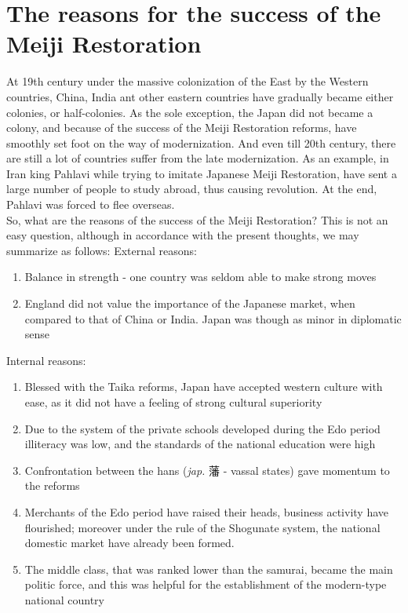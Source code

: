 \documentclass[11pt]{book}
\begin{document}
\section{The reasons for the success of the Meiji Restoration}
At 19th century under the massive colonization of the East by the Western countries, China, India ant other eastern countries have gradually became
either colonies, or half-colonies. As the sole exception, the Japan did not became a colony, and because of the success of the Meiji Restoration
reforms, have smoothly set foot on the way of modernization. And even till 20th century, there are still a lot of countries suffer from the late
modernization. As an example, in Iran king Pahlavi while trying to imitate Japanese Meiji Restoration, have sent a large number of people
to study abroad, thus causing revolution. At the end, Pahlavi was forced to flee overseas.\\
So, what are the reasons of the success of the Meiji Restoration? This is not an easy question, although in accordance with the present thoughts,
we may summarize as follows:
External reasons:
\begin{enumerate}
	\item{Balance in strength - one country was seldom able to make strong moves}
	\item{England did not value the importance of the Japanese market, when compared to that of China or India. Japan was though as minor
		in diplomatic sense}
\end{enumerate}
Internal reasons:
\begin{enumerate}
	\item{Blessed with the Taika reforms, Japan have accepted western culture with ease, as it did not have a feeling of strong cultural
		superiority}
	\item{Due to the system of the private schools developed during the Edo period illiteracy was low, and the standards of the national
		education were high}
	\item{Confrontation between the hans (\textit{jap.} 藩 - vassal states) gave momentum to the reforms}
	\item{Merchants of the Edo period have raised their heads, business activity have flourished; moreover under the rule of the Shogunate
		system, the national domestic market have already been formed.}
	\item{The middle class, that was ranked lower than the samurai, became the main politic force, and this was helpful for the establishment
		of the modern-type national country}
\end{enumerate}
\end{document}
